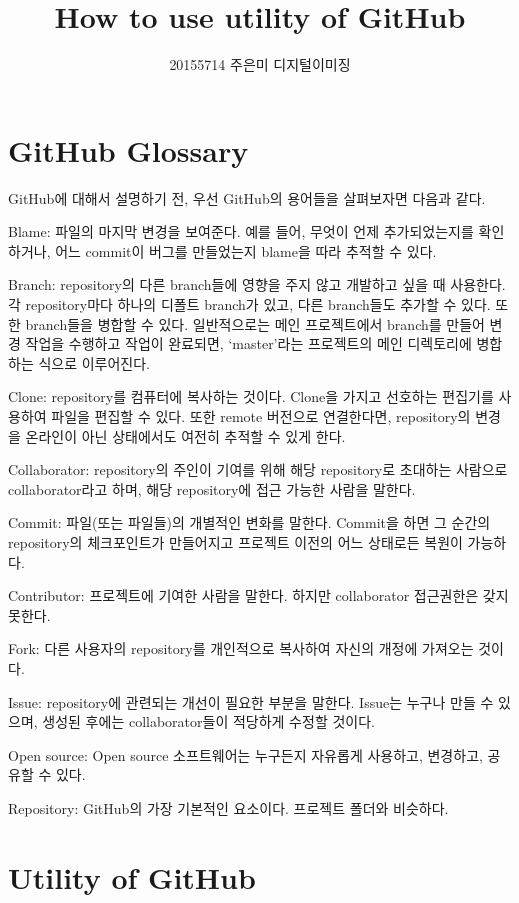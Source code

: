 \documentclass[prodmode,acmtap]{ci2014}
\title{How to use utility of GitHub}
\author{20155714 주은미 디지털이미징}
\begin{document}
\maketitle

\section{GitHub Glossary}

GitHub에 대해서 설명하기 전, 우선 GitHub의 용어들을 살펴보자면 다음과 같다.

Blame: 파일의 마지막 변경을 보여준다. 예를 들어, 무엇이 언제 추가되었는지를 확인하거나, 어느 commit이 버그를 만들었는지 blame을 따라 추적할 수 있다.

Branch: repository의 다른 branch들에 영향을 주지 않고 개발하고 싶을 때 사용한다. 각 repository마다 하나의 디폴트 branch가 있고, 다른 branch들도 추가할 수 있다. 또한 branch들을 병합할 수 있다. 일반적으로는 메인 프로젝트에서 branch를 만들어 변경 작업을 수행하고 작업이 완료되면, ‘master’라는 프로젝트의 메인 디렉토리에 병합하는 식으로 이루어진다.

Clone: repository를 컴퓨터에 복사하는 것이다. Clone을 가지고 선호하는 편집기를 사용하여 파일을 편집할 수 있다. 또한 remote 버전으로 연결한다면, repository의 변경을 온라인이 아닌 상태에서도 여전히 추적할 수 있게 한다.

Collaborator: repository의 주인이 기여를 위해 해당 repository로 초대하는 사람으로 collaborator라고 하며, 해당 repository에 접근 가능한 사람을 말한다.

Commit: 파일(또는 파일들)의 개별적인 변화를 말한다. Commit을 하면 그 순간의 repository의 체크포인트가 만들어지고 프로젝트 이전의 어느 상태로든 복원이 가능하다.

Contributor: 프로젝트에 기여한 사람을 말한다. 하지만 collaborator 접근권한은 갖지 못한다.

Fork: 다른 사용자의 repository를 개인적으로 복사하여 자신의 개정에 가져오는 것이다.

Issue: repository에 관련되는 개선이 필요한 부분을 말한다. Issue는 누구나 만들 수 있으며, 생성된 후에는 collaborator들이 적당하게 수정할 것이다.

Open source: Open source 소프트웨어는 누구든지 자유롭게 사용하고, 변경하고, 공유할 수 있다.

Repository: GitHub의 가장 기본적인 요소이다. 프로젝트 폴더와 비슷하다.


\section{Utility of GitHub}
\end{document}
